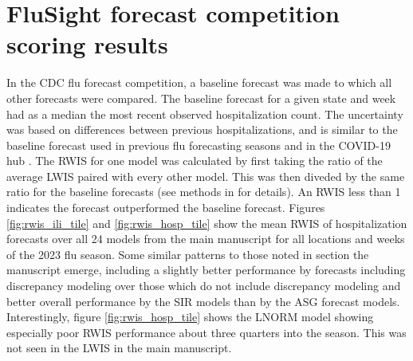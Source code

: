 \documentclass{article}
\begin{document}
\newpage
\section{FluSight forecast competition scoring results} \label{app:A_rwis}

In the CDC flu forecast competition, a baseline forecast was made to which all other forecasts were compared. The baseline forecast for a given state and week had as a median the most recent observed hospitalization count. The uncertainty was based on differences between previous hospitalizations, and is similar to the baseline forecast used in previous flu forecasting seasons and in the COVID-19 hub \cite[]{mathis2024evaluation, cramer2022evaluation}. 
The RWIS for one model was calculated by first taking the ratio of the average LWIS paired with every other model. This was then diveded by the same ratio for the baseline forecasts (see methods in \cite{mathis2024evaluation} for details).
 An RWIS less than 1 indicates the forecast outperformed the baseline forecast.
 Figures \ref{fig:rwis_ili_tile} and \ref{fig:rwis_hosp_tile} show the mean RWIS of hospitalization forecasts over all 24 models from the main manuscript for all locations and weeks of the 2023 flu season. Some similar patterns to those noted in section the manuscript emerge, including a slightly better performance by forecasts including discrepancy modeling over those which do not include discrepancy modeling and better overall performance by the SIR models than by the ASG forecast models. Interestingly, figure \ref{fig:rwis_hosp_tile} shows the LNORM model showing especially poor RWIS performance about three quarters into the season. This was not seen in the LWIS in the main manuscript. %
\end{document}
